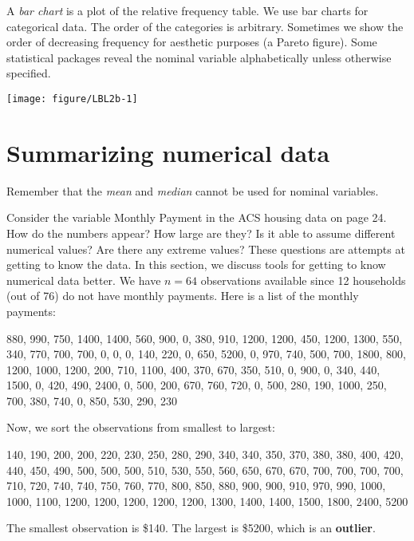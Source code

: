 \documentclass[11pt]{book}\usepackage[]{graphicx}\usepackage[]{color}
\begin{document}
A \textit{bar chart} is a plot of the relative frequency table.  We use bar charts for categorical data. The order of the categories is arbitrary.  Sometimes we show the order of decreasing frequency for aesthetic purposes (a Pareto figure).  Some statistical packages reveal the nominal variable alphabetically unless otherwise specified. 



{\centering \texttt{[image: figure/LBL2b-1]} 

}





\section{Summarizing numerical data}

Remember that the	\textit{mean} and \textit{median} cannot be used for nominal variables.

Consider the variable Monthly Payment in the ACS housing data on page 24.  How do the numbers appear?  How large are they? Is it able to assume different numerical values?  Are there any extreme values? These questions are attempts at getting to know the data.  In this section, we discuss tools for getting to know numerical data better.  We have $n = 64$ observations available since 12 households (out of 76) do not have monthly payments.  Here is a list of the monthly payments:

{\small{
880, 990, 750, 1400, 1400, 560, 900, 0, 380, 910, 1200, 1200, 450, 1200, 1300, 550, 340, 770, 700, 700, 0, 0, 0, 140, 220, 0, 650, 5200, 0, 970, 740, 500, 700, 1800, 800, 1200, 1000, 1200, 200, 710, 1100, 400, 370, 670, 350, 510, 0, 900, 0, 340, 440, 1500, 0, 420, 490, 2400, 0, 500, 200, 670, 760, 720, 0, 500, 280, 190, 1000, 250, 700, 380, 740, 0, 850, 530, 290, 230
}}

Now, we sort the observations from smallest to largest:

{\small{
140, 190, 200, 200, 220, 230, 250, 280, 290, 340, 340, 350, 370, 380, 380, 400, 420, 440, 450, 490, 500, 500, 500, 510, 530, 550, 560, 650, 670, 670, 700, 700, 700, 700, 710, 720, 740, 740, 750, 760, 770, 800, 850, 880, 900, 900, 910, 970, 990, 1000, 1000, 1100, 1200, 1200, 1200, 1200, 1200, 1300, 1400, 1400, 1500, 1800, 2400, 5200
}}

The smallest observation is \$140.  The largest is \$5200, which is an \textbf{outlier}.

\end{document}
